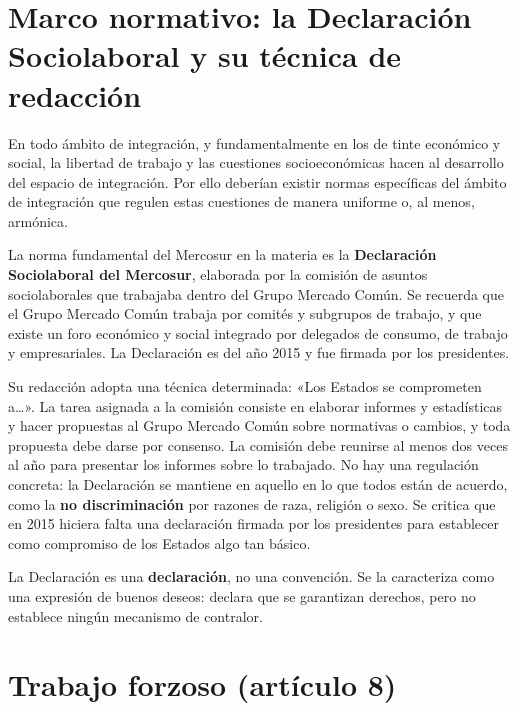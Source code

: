 \documentclass[12pt,oneside]{book}
\begin{document}
\section{Marco normativo: la Declaración Sociolaboral y su técnica de redacción}

En todo ámbito de integración, y fundamentalmente en los de tinte económico y social, la libertad de trabajo y las cuestiones socioeconómicas hacen al desarrollo del espacio de integración. Por ello deberían existir normas específicas del ámbito de integración que regulen estas cuestiones de manera uniforme o, al menos, armónica.

La norma fundamental del Mercosur en la materia es la \textbf{Declaración Sociolaboral del Mercosur}, elaborada por la comisión de asuntos sociolaborales que trabajaba dentro del Grupo Mercado Común. Se recuerda que el Grupo Mercado Común trabaja por comités y subgrupos de trabajo, y que existe un foro económico y social integrado por delegados de consumo, de trabajo y empresariales. La Declaración es del año 2015 y fue firmada por los presidentes.

Su redacción adopta una técnica determinada: «Los Estados se comprometen a\ldots». La tarea asignada a la comisión consiste en elaborar informes y estadísticas y hacer propuestas al Grupo Mercado Común sobre normativas o cambios, y toda propuesta debe darse por consenso. La comisión debe reunirse al menos dos veces al año para presentar los informes sobre lo trabajado.
No hay una regulación concreta: la Declaración se mantiene en aquello en lo que todos están de acuerdo, como la \textbf{no discriminación} por razones de raza, religión o sexo. Se critica que en 2015 hiciera falta una declaración firmada por los presidentes para establecer como compromiso de los Estados algo tan básico.

\begin{important}
La Declaración es una \textbf{declaración}, no una convención. Se la caracteriza como una expresión de buenos deseos: declara que se garantizan derechos, pero no establece ningún mecanismo de contralor.
\end{important}

\section{Trabajo forzoso (artículo 8)}
\end{document}
